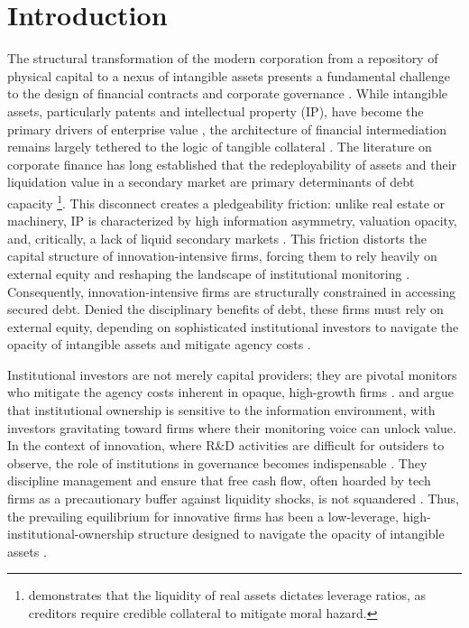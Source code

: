 \documentclass[12pt,a4paper]{article}
\begin{document}
\renewcommand{\baselinestretch}{2}
\normalsize \baselineskip=25pt




\section{Introduction}
The structural transformation of the modern corporation from a repository of physical capital to a nexus of intangible assets presents a fundamental challenge to the design of financial contracts and corporate governance \citep{teece2010technologica,bolton2019optimal}. While intangible assets, particularly patents and intellectual property (IP), have become the primary drivers of enterprise value \citep{gill2024leveraging,castaldi2024are}, the architecture of financial intermediation remains largely tethered to the logic of tangible collateral \citep{pape2024co,beaverstock2023financial,luck2023}. The literature on corporate finance has long established that the redeployability of assets and their liquidation value in a secondary market are primary determinants of debt capacity \citep{dietrich2007asset,flor2013asset} \footnote{\cite{acharya2011leverage} demonstrates that the liquidity of real assets dictates leverage ratios, as creditors require credible collateral to mitigate moral hazard.}. This disconnect creates a pledgeability friction: unlike real estate or machinery, IP is characterized by high information asymmetry, valuation opacity, and, critically, a lack of liquid secondary markets \citep{fischer2014patents,hochberg2018patent,arora2024,ewens2025measuring}. This friction distorts the capital structure of innovation-intensive firms, forcing them to rely heavily on external equity and reshaping the landscape of institutional monitoring \citep{schain2021innovation,brown2009financing}. Consequently, innovation-intensive firms are structurally constrained in accessing secured debt. Denied the disciplinary benefits of debt, these firms must rely on external equity, depending on sophisticated institutional investors to navigate the opacity of intangible assets and mitigate agency costs \citep{mccahery2016behind,boubaker2019does}.

Institutional investors are not merely capital providers; they are pivotal monitors who mitigate the agency costs inherent in opaque, high-growth firms \citep{maznorbalia2023exploring,drobetz2024beyond,cao2025site}. \cite{mcnulty2016ownership} and \cite{mccahery2016behind} argue that institutional ownership is sensitive to the information environment, with investors gravitating toward firms where their monitoring voice can unlock value. In the context of innovation, where R\&D activities are difficult for outsiders to observe, the role of institutions in governance becomes indispensable \citep{aghion2013innovation,luong2017foreign}. They discipline management and ensure that free cash flow, often hoarded by tech firms as a precautionary buffer against liquidity shocks, is not squandered \citep{faulkender2006corporate,harford2014refinancing}. Thus, the prevailing equilibrium for innovative firms has been a low-leverage, high-institutional-ownership structure designed to navigate the opacity of intangible assets \citep{ma2024firm}.
\end{document}
